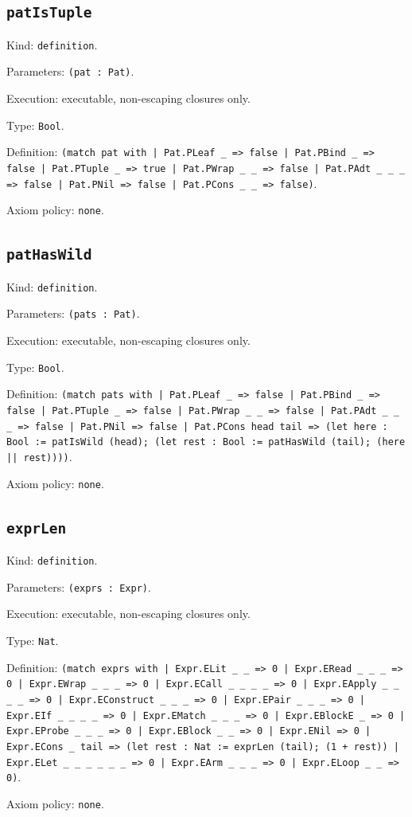 \documentclass[11pt]{article}
\begin{document}
\subsection*{\texttt{patIsTuple}}
\noindent Kind: \texttt{definition}.\par
\noindent Parameters: \texttt{(pat : Pat)}.\par
\noindent Execution: executable, non-escaping closures only.\par
\noindent Type: \texttt{Bool}.\par
\noindent Definition: \texttt{(match pat with | Pat.PLeaf \_ => false | Pat.PBind \_ => false | Pat.PTuple \_ => true | Pat.PWrap \_ \_ => false | Pat.PAdt \_ \_ \_ => false | Pat.PNil => false | Pat.PCons \_ \_ => false)}.\par
\noindent Axiom policy: \texttt{none}.\par
\subsection*{\texttt{patHasWild}}
\noindent Kind: \texttt{definition}.\par
\noindent Parameters: \texttt{(pats : Pat)}.\par
\noindent Execution: executable, non-escaping closures only.\par
\noindent Type: \texttt{Bool}.\par
\noindent Definition: \texttt{(match pats with | Pat.PLeaf \_ => false | Pat.PBind \_ => false | Pat.PTuple \_ => false | Pat.PWrap \_ \_ => false | Pat.PAdt \_ \_ \_ => false | Pat.PNil => false | Pat.PCons head tail => (let here : Bool := patIsWild (head); (let rest : Bool := patHasWild (tail); (here || rest))))}.\par
\noindent Axiom policy: \texttt{none}.\par
\subsection*{\texttt{exprLen}}
\noindent Kind: \texttt{definition}.\par
\noindent Parameters: \texttt{(exprs : Expr)}.\par
\noindent Execution: executable, non-escaping closures only.\par
\noindent Type: \texttt{Nat}.\par
\noindent Definition: \texttt{(match exprs with | Expr.ELit \_ \_ => 0 | Expr.ERead \_ \_ \_ => 0 | Expr.EWrap \_ \_ \_ => 0 | Expr.ECall \_ \_ \_ \_ => 0 | Expr.EApply \_ \_ \_ \_ => 0 | Expr.EConstruct \_ \_ \_ => 0 | Expr.EPair \_ \_ \_ => 0 | Expr.EIf \_ \_ \_ \_ => 0 | Expr.EMatch \_ \_ \_ => 0 | Expr.EBlockE \_ => 0 | Expr.EProbe \_ \_ \_ => 0 | Expr.EBlock \_ \_ => 0 | Expr.ENil => 0 | Expr.ECons \_ tail => (let rest : Nat := exprLen (tail); (1 + rest)) | Expr.ELet \_ \_ \_ \_ \_ \_ => 0 | Expr.EArm \_ \_ \_ => 0 | Expr.ELoop \_ \_ => 0)}.\par
\noindent Axiom policy: \texttt{none}.\par
\end{document}
